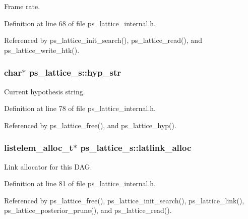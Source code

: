 Frame rate. 



Definition at line 68 of file ps\-\_\-lattice\-\_\-internal.\-h.



Referenced by ps\-\_\-lattice\-\_\-init\-\_\-search(), ps\-\_\-lattice\-\_\-read(), and ps\-\_\-lattice\-\_\-write\-\_\-htk().

\subsubsection[{hyp\-\_\-str}]{\setlength{\rightskip}{0pt plus 5cm}char$\ast$ ps\-\_\-lattice\-\_\-s\-::hyp\-\_\-str}\label{structps__lattice__s_ac3844c69f8393b607047bd9b302b979a}


Current hypothesis string. 



Definition at line 78 of file ps\-\_\-lattice\-\_\-internal.\-h.



Referenced by ps\-\_\-lattice\-\_\-free(), and ps\-\_\-lattice\-\_\-hyp().

\subsubsection[{latlink\-\_\-alloc}]{\setlength{\rightskip}{0pt plus 5cm}listelem\-\_\-alloc\-\_\-t$\ast$ ps\-\_\-lattice\-\_\-s\-::latlink\-\_\-alloc}\label{structps__lattice__s_afa8ca535dc8bf2cc656f6ad477e13b9f}


Link allocator for this D\-A\-G. 



Definition at line 81 of file ps\-\_\-lattice\-\_\-internal.\-h.



Referenced by ps\-\_\-lattice\-\_\-free(), ps\-\_\-lattice\-\_\-init\-\_\-search(), ps\-\_\-lattice\-\_\-link(), ps\-\_\-lattice\-\_\-posterior\-\_\-prune(), and ps\-\_\-lattice\-\_\-read().

